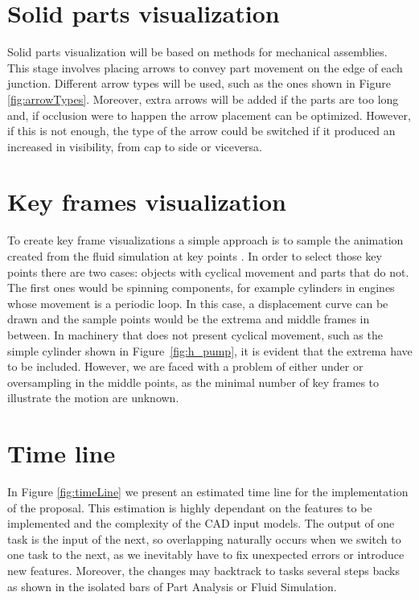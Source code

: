 \section{Solid parts visualization}

Solid parts visualization will be based on \cite{Mitra2010} methods for mechanical assemblies.
This stage involves placing arrows to convey part movement on the edge of each junction.
Different arrow types will be used, such as the ones shown in Figure \ref{fig:arrowTypes}.
Moreover, extra arrows will be added if the parts are too long and, if occlusion were to happen the arrow placement can be optimized.
However, if this is not enough, the type of the arrow could be switched if it produced an increased in visibility, from cap to side or viceversa.

\section{Key frames visualization}

To create key frame visualizations a simple approach is to sample the animation created from the fluid simulation at key points \cite{Mitra2010}.
In order to select those key points there are two cases: objects with cyclical movement and parts that do not.
The first ones would be spinning components, for example cylinders in engines whose movement is a periodic loop.
In this case, a displacement curve can be drawn and the sample points would be the extrema and middle frames in between.
In machinery that does not present cyclical movement, such as the simple cylinder shown in Figure~\ref{fig:h_pump}, it is evident that the extrema have to be included.
However, we are faced with a problem of either under or oversampling in the middle points, as the minimal number of key frames to illustrate the motion are unknown. 

\section{Time line}

In Figure \ref{fig:timeLine} we present an estimated time line for the implementation of the proposal.
This estimation is highly dependant on the features to be implemented and the complexity of the CAD input models.
The output of one task is the input of the next, so overlapping naturally occurs when we switch to one task to the next, as we inevitably have to fix unexpected errors or introduce new features.
Moreover, the changes may backtrack to tasks several steps backs as shown in the isolated bars of Part Analysis or Fluid Simulation. 

